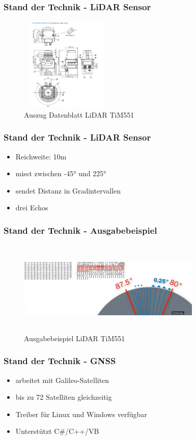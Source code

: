 \documentclass{beamer}
\begin{document}
\begin{frame}
\frametitle{Stand der Technik - LiDAR Sensor}
	\begin{figure}[h!]
  		\caption{Auszug Datenblatt LiDAR TiM551}
		\includegraphics[width = 170px, height = 170px]{LidarTim551Drawing.PNG}	
	\end{figure}
\end{frame}

\begin{frame}
\frametitle{Stand der Technik - LiDAR Sensor}
\begin{itemize}
\item<1-> Reichweite: 10m 
\item<2-> misst zwischen -45° und 225°
\item<3-> sendet Distanz in Gradintervallen
\item<4> drei Echos
\end{itemize}
\end{frame}

\begin{frame}
\frametitle{Stand der Technik - Ausgabebeispiel}
	\begin{figure}[h!]
  		\caption{Ausgabebeispiel LiDAR TiM551}
		\includegraphics[width = 330px, height = 170px]{Lidar-OutputExample.PNG}	
	\end{figure}
\end{frame}

\begin{frame}
\frametitle{Stand der Technik - GNSS}
\begin{itemize}
\item<1-> arbeitet mit Galileo-Satelliten
\item<2-> bis zu 72 Satelliten gleichzeitig
\item<3-> Treiber für Linux und Windows verfügbar
\item<4> Unterstützt C\#/C++/VB
\end{itemize}
\end{frame}
\end{document}
